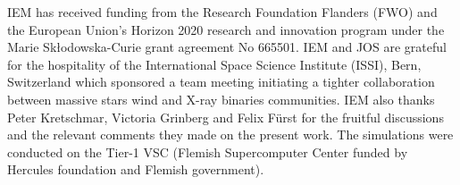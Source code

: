 \documentclass[a4paper,fleqn,usenatbib]{mnras}
\begin{document}
IEM has received funding from the Research Foundation Flanders (FWO) and the European Union's Horizon 2020 research and innovation program under the Marie Sk\l odowska-Curie grant agreement No 665501. IEM and JOS are grateful for the hospitality of the International Space Science Institute (ISSI), Bern, Switzerland which sponsored a team meeting initiating a tighter collaboration between massive stars wind and X-ray binaries communities. IEM also thanks Peter Kretschmar, Victoria Grinberg and Felix F\"urst for the fruitful discussions and the relevant comments they made on the present work. The simulations were conducted on the Tier-1 VSC (Flemish Supercomputer Center funded by Hercules foundation and Flemish government).





\begin{tiny}

\end{tiny}



\bsp	%
\label{lastpage}
\end{document}

